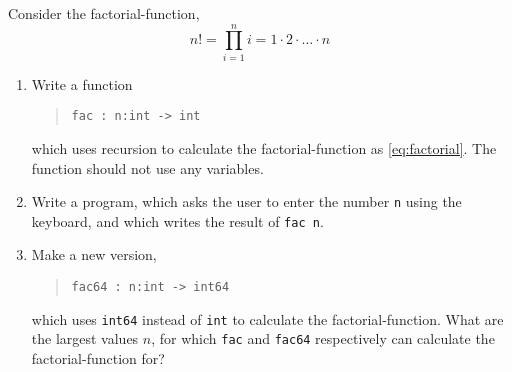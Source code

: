 Consider the factorial-function,
\begin{equation}
  n! = \prod_{i=1}^n i = 1\cdot 2\cdot \ldots \cdot n
  \label{eq:factorial}
\end{equation}
\begin{enumerate}
\item Write a function
  \begin{quote}
    \mbox{\lstinline!fac : n:int -> int!}
  \end{quote}
  which uses recursion to calculate the factorial-function as \eqref{eq:factorial}. The function should not use any variables. 
  \item Write a program, which asks the user to enter the number
    \lstinline!n! using the keyboard, and which writes the result of \lstinline!fac n!.
  \item Make a new version, 
    \begin{quote}
      \mbox{\lstinline!fac64 : n:int -> int64!}
    \end{quote}
    which uses \lstinline{int64} instead of \lstinline{int} to
    calculate the factorial-function. What are the largest values $n$,
    for which \lstinline{fac} and \lstinline{fac64} respectively can
    calculate the factorial-function for?
  \end{enumerate}
